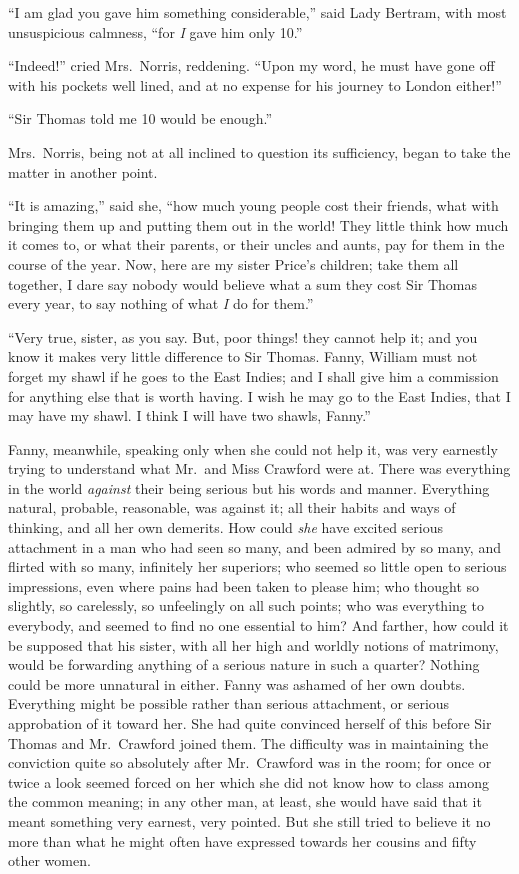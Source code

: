 ``I am glad you gave him something considerable,''
said Lady Bertram, with most unsuspicious calmness,
``for \emph{I} gave him only 10.''

``Indeed!'' cried Mrs.\ Norris, reddening.  ``Upon my word,
he must have gone off with his pockets well lined,
and at no expense for his journey to London either!''

``Sir Thomas told me 10 would be enough.''

Mrs.\ Norris, being not at all inclined to question
its sufficiency, began to take the matter in another point.

``It is amazing,'' said she, ``how much young people cost
their friends, what with bringing them up and putting them
out in the world!  They little think how much it comes to,
or what their parents, or their uncles and aunts, pay for
them in the course of the year.  Now, here are my sister
Price's children; take them all together, I dare say nobody
would believe what a sum they cost Sir Thomas every year,
to say nothing of what \emph{I} do for them.''

``Very true, sister, as you say.  But, poor things!
they cannot help it; and you know it makes very little
difference to Sir Thomas.  Fanny, William must not forget
my shawl if he goes to the East Indies; and I shall give
him a commission for anything else that is worth having.
I wish he may go to the East Indies, that I may have my shawl.
I think I will have two shawls, Fanny.''

Fanny, meanwhile, speaking only when she could not help it,
was very earnestly trying to understand what Mr.\ and Miss
Crawford were at.  There was everything in the world
\emph{against} their being serious but his words and manner.
Everything natural, probable, reasonable, was against it;
all their habits and ways of thinking, and all
her own demerits.  How could \emph{she} have excited
serious attachment in a man who had seen so many,
and been admired by so many, and flirted with so many,
infinitely her superiors; who seemed so little open
to serious impressions, even where pains had been taken
to please him; who thought so slightly, so carelessly,
so unfeelingly on all such points; who was everything
to everybody, and seemed to find no one essential to him?
And farther, how could it be supposed that his sister,
with all her high and worldly notions of matrimony,
would be forwarding anything of a serious nature in such
a quarter?  Nothing could be more unnatural in either.
Fanny was ashamed of her own doubts.  Everything might
be possible rather than serious attachment, or serious
approbation of it toward her.  She had quite convinced herself
of this before Sir Thomas and Mr.\ Crawford joined them.
The difficulty was in maintaining the conviction quite
so absolutely after Mr.\ Crawford was in the room;
for once or twice a look seemed forced on her which she
did not know how to class among the common meaning;
in any other man, at least, she would have said
that it meant something very earnest, very pointed.
But she still tried to believe it no more than what he
might often have expressed towards her cousins and fifty
other women.


